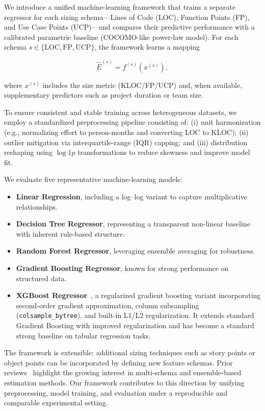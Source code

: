 \documentclass{ieeeaccess}
\begin{document}
We introduce a unified machine-learning framework that trains a separate regressor for each sizing schema---Lines of Code (LOC), Function Points (FP), and Use Case Points (UCP)---and compares their predictive performance with a calibrated parametric baseline (COCOMO-like power-law model). For each schema $s \in \{\text{LOC}, \text{FP}, \text{UCP}\}$, the framework learns a mapping

\begin{equation}
\hat{E}^{(s)} = f^{(s)}(x^{(s)}),
\end{equation}

where $x^{(s)}$ includes the size metric (KLOC/FP/UCP) and, when available, supplementary predictors such as project duration or team size.

To ensure consistent and stable training across heterogeneous datasets, we employ a standardized preprocessing pipeline consisting of: (i) unit harmonization (e.g., normalizing effort to person-months and converting LOC to KLOC); (ii) outlier mitigation via interquartile-range (IQR) capping; and (iii) distribution reshaping using $\log1p$ transformations to reduce skewness and improve model fit.

We evaluate five representative machine-learning models:
\begin{itemize}[leftmargin=1.3em]
    \item \textbf{Linear Regression}, including a log--log variant to capture multiplicative relationships.
    \item \textbf{Decision Tree Regressor}, representing a transparent non-linear baseline with inherent rule-based structure.
    \item \textbf{Random Forest Regressor}, leveraging ensemble averaging for robustness.
    \item \textbf{Gradient Boosting Regressor}, known for strong performance on structured data.
    \item \textbf{XGBoost Regressor}~\cite{chen2016xgboost}, a regularized gradient boosting variant incorporating second-order gradient approximation, column subsampling (\texttt{colsample\_bytree}), and built-in L1/L2 regularization. It extends standard Gradient Boosting with improved regularization and has become a standard strong baseline on tabular regression tasks.
\end{itemize}

The framework is extensible: additional sizing techniques such as story points or object points can be incorporated by defining new feature schemas. Prior reviews~\cite{tanveer2023survey,azzeh2019cross} highlight the growing interest in multi-schema and ensemble-based estimation methods. Our framework contributes to this direction by unifying preprocessing, model training, and evaluation under a reproducible and comparable experimental setting.
\end{document}
